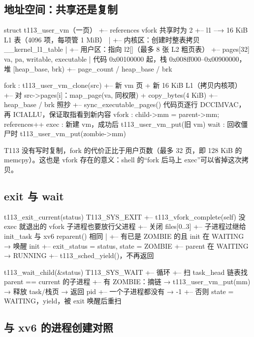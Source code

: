 \subsection{地址空间：共享还是复制}

\begin{txtcode}[basicstyle=\ttfamily\scriptsize]
struct t113_user_vm（一页）
+-- references                      vfork 共享时为 2
+-- l1 --→ 16 KiB L1 表（4096 项，每项管 1 MiB）
|          +-- 内核区：创建时整表拷贝 __kernel_l1_table
|          +-- 用户区：指向 l2[]（最多 8 张 L2 粗页表）
+-- pages[32]  {va, pa, writable, executable}
|          代码 0x00100000 起，栈 0x008ff000–0x00900000，堆 [heap_base, brk)
+-- page_count / heap_base / brk

fork  : t113_user_vm_clone(src)
        +-- 新 vm 页 + 新 16 KiB L1（拷贝内核项）
        +-- 对 src->pages[i]：map_page(va, 同权限) + copy_bytes(4 KiB)
        +-- heap_base / brk 照抄
        +-- sync_executable_pages()       代码页逐行 DCCIMVAC，再 ICIALLU，保证取指看到新内容
vfork : child->mm = parent->mm; references++
exec  : 新建 vm，成功后 t113_user_vm_put(旧 vm)
wait  : 回收僵尸时 t113_user_vm_put(zombie->mm)
\end{txtcode}

T113 没有写时复制，fork 的代价正比于用户页数（最多 32 页，即 128 KiB 的memcpy）。这也是 vfork 存在的意义：shell 的“fork 后马上 exec”可以省掉这次拷贝。

\subsection{exit 与 wait}

\begin{txtcode}
t113_exit_current(status)                 T113_SYS_EXIT
+-- t113_vfork_complete(self)             没 exec 就退出的 vfork 子进程也要放行父进程
+-- 关闭 files[0..3]
+-- 子进程过继给 init_task                  与 xv6 reparent() 相同
|   +-- 有已是 ZOMBIE 的且 init 在 WAITING → 唤醒 init
+-- exit_status = status, state = ZOMBIE
+-- parent 在 WAITING → RUNNING
+-- t113_sched_yield()，不再返回

t113_wait_child(&status)                  T113_SYS_WAIT
+-- 循环
    +-- 扫 task_head 链表找 parent == current 的子进程
    +-- 有 ZOMBIE：摘链 → t113_user_vm_put(mm) → 释放 task/栈页 → 返回 pid
    +-- 一个子进程都没有 → -1
    +-- 否则 state = WAITING，yield，被 exit 唤醒后重扫
\end{txtcode}

\subsection{与 xv6 的进程创建对照}

